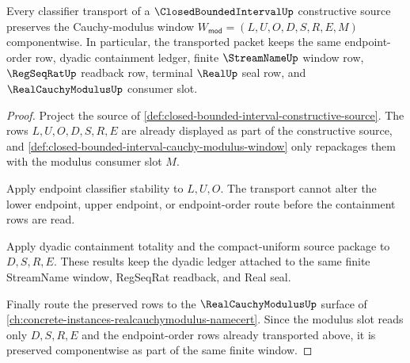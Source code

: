 \begin{theorem}
\label{thm:closed-bounded-interval-modulus-window-transport}
Every classifier transport of a $\ClosedBoundedIntervalUp$ constructive source preserves the Cauchy-modulus window $W_{\mathsf{mod}}=(L,U,O,D,S,R,E,M)$ componentwise. In particular, the transported packet keeps the same endpoint-order row, dyadic containment ledger, finite $\StreamNameUp$ window row, $\RegSeqRatUp$ readback row, terminal $\RealUp$ seal row, and $\RealCauchyModulusUp$ consumer slot.
\end{theorem}
\begin{proof}
Project the source of \autoref{def:closed-bounded-interval-constructive-source}. The rows $L,U,O,D,S,R,E$ are already displayed as part of the constructive source, and \autoref{def:closed-bounded-interval-cauchy-modulus-window} only repackages them with the modulus consumer slot $M$.

Apply endpoint classifier stability to $L,U,O$. The transport cannot alter the lower endpoint, upper endpoint, or endpoint-order route before the containment rows are read.

Apply dyadic containment totality and the compact-uniform source package to $D,S,R,E$. These results keep the dyadic ledger attached to the same finite StreamName window, RegSeqRat readback, and Real seal.

Finally route the preserved rows to the $\RealCauchyModulusUp$ surface of \autoref{ch:concrete-instances-realcauchymodulus-namecert}. Since the modulus slot reads only $D,S,R,E$ and the endpoint-order rows already transported above, it is preserved componentwise as part of the same finite window.
\end{proof}

